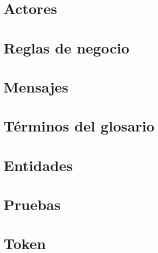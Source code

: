 \documentclass[10pt]{book}
\begin{document}
\chapter{Actores}\label{cap:gestionarActores}
\chapter{Reglas de negocio}\label{cap:gestionarReglasNegocio}
\chapter{Mensajes}\label{cap:gestionarMensajes}
\chapter{Términos del glosario}\label{cap:gestionarTerminos}
\chapter{Entidades}\label{cap:gestionarEntidades}
\chapter{Pruebas}\label{cap:pruebas}
\chapter{Token}\label{cap:token}
\end{document}
